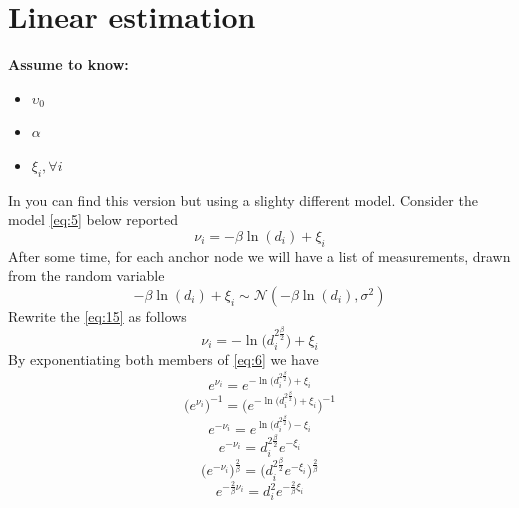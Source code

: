 \documentclass[12pt,twoside]{report}
\begin{document}
\section{Linear estimation}
  \begin{center}
  \textbf{Assume to know:}
  \begin{itemize}
    \centering
    \item $\upsilon_0$
    \item $\alpha$
    \item $\xi_i,\forall i$
  \end{itemize}
  \end{center}
In \cite{rzk} you can find this version but using a slighty different model.
Consider the model \ref{eq:5} below reported
\begin{equation}
    \nu_i=-\beta\ln(d_i)+\xi_i
    \label{eq:15}
\end{equation}
After some time, for each anchor node we will have a list of measurements, drawn from the random variable 
\begin{equation}
-\beta\ln(d_i)+\xi_i\sim \mathcal{N}(-\beta\ln(d_i),\sigma^2)
\label{eq:14}
\end{equation}
Rewrite the \ref{eq:15} as follows 
\begin{equation}
    \nu_i=-\ln\big(d_i^{2\frac{\beta}{2}}\big)+\xi_i
    \label{eq:6}
\end{equation}
By exponentiating both members of \ref{eq:6} we have 
\begin{equation}
    e^{\nu_i}=e^{-\ln\big(d_i^{2\frac{\beta}{2}}\big)+\xi_i}
\end{equation}
\begin{equation}
    \bigg(e^{\nu_i}\bigg)^{-1}=\bigg(e^{-\ln\big(d_i^{2\frac{\beta}{2}}\big)+\xi_i}\bigg)^{-1}
\end{equation}
\begin{equation}
    e^{-\nu_i}=e^{\ln\big(d_i^{2\frac{\beta}{2}}\big)-\xi_i}
\end{equation}
\begin{equation}
    e^{-\nu_i}=d_i^{2\frac{\beta}{2}}e^{-\xi_i}
\end{equation}
\begin{equation}
    \bigg(e^{-\nu_i}\bigg)^{\frac{2}{\beta}}=\bigg(d_i^{2\frac{\beta}{2}}e^{-\xi_i}\bigg)^{\frac{2}{\beta}}
\end{equation}
\begin{equation}
    e^{-\frac{2}{\beta}\nu_i}=d_i^2e^{-\frac{2}{\beta}\xi_i}
\end{equation}
\end{document}
